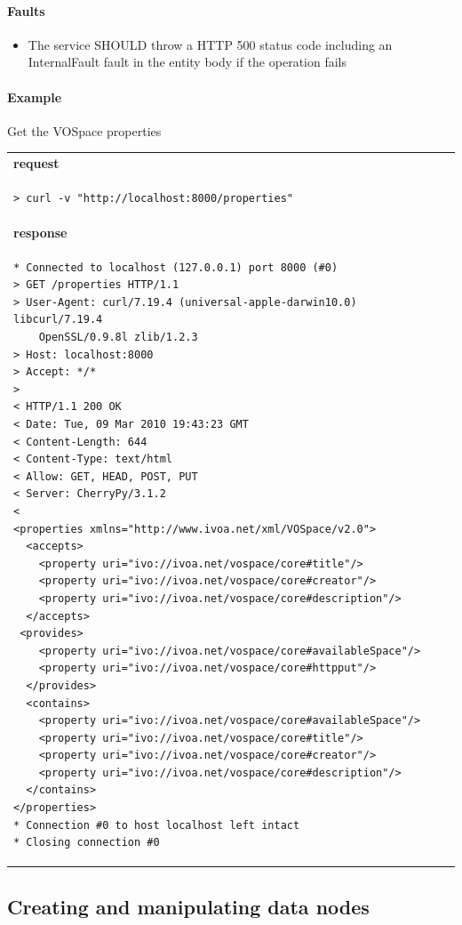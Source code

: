 \documentclass[11pt,a4paper]{ivoa}
\begin{document}
\paragraph{Faults}
\begin{itemize}
    \item The service SHOULD throw a HTTP 500 status code including an InternalFault fault in the entity body if the operation fails
\end{itemize}

\paragraph{Example}
Get the VOSpace properties

\begin{tabular}{ p{10cm} }
\\
\textbf{request} \\
\begin{lstlisting}
> curl -v "http://localhost:8000/properties"
\end{lstlisting} \\
\textbf{response} \\
\begin{lstlisting}
* Connected to localhost (127.0.0.1) port 8000 (#0)
> GET /properties HTTP/1.1
> User-Agent: curl/7.19.4 (universal-apple-darwin10.0) libcurl/7.19.4
    OpenSSL/0.9.8l zlib/1.2.3
> Host: localhost:8000
> Accept: */*
> 
< HTTP/1.1 200 OK
< Date: Tue, 09 Mar 2010 19:43:23 GMT
< Content-Length: 644
< Content-Type: text/html
< Allow: GET, HEAD, POST, PUT
< Server: CherryPy/3.1.2
< 
<properties xmlns="http://www.ivoa.net/xml/VOSpace/v2.0">
  <accepts>
    <property uri="ivo://ivoa.net/vospace/core#title"/>
    <property uri="ivo://ivoa.net/vospace/core#creator"/>
    <property uri="ivo://ivoa.net/vospace/core#description"/>
  </accepts>
 <provides>
    <property uri="ivo://ivoa.net/vospace/core#availableSpace"/>
    <property uri="ivo://ivoa.net/vospace/core#httpput"/>
  </provides>
  <contains>
    <property uri="ivo://ivoa.net/vospace/core#availableSpace"/>
    <property uri="ivo://ivoa.net/vospace/core#title"/>
    <property uri="ivo://ivoa.net/vospace/core#creator"/>
    <property uri="ivo://ivoa.net/vospace/core#description"/>
  </contains>
</properties>
* Connection #0 to host localhost left intact
* Closing connection #0
\end{lstlisting} \\
\end{tabular}

\subsection{Creating and manipulating data nodes}
\end{document}

